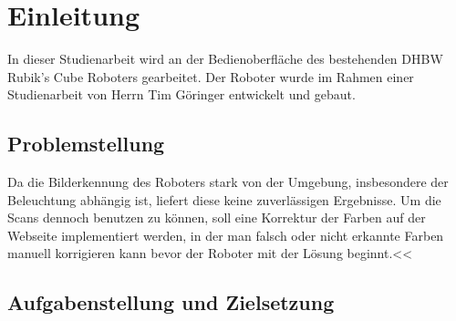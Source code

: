 
\chapter{Einleitung}
In dieser Studienarbeit wird an der Bedienoberfläche des bestehenden DHBW Rubik's Cube Roboters gearbeitet. 
Der Roboter wurde im Rahmen einer Studienarbeit von Herrn Tim Göringer entwickelt und gebaut. 

\section{Problemstellung}
Da die Bilderkennung des Roboters stark von der Umgebung, insbesondere der Beleuchtung abhängig ist,
liefert diese keine zuverlässigen Ergebnisse. Um die Scans dennoch benutzen zu können, soll eine 
Korrektur der Farben auf der Webseite implementiert werden, in der man falsch oder nicht erkannte Farben
manuell korrigieren kann bevor der Roboter mit der Lösung beginnt.<<

\section{Aufgabenstellung und Zielsetzung}
